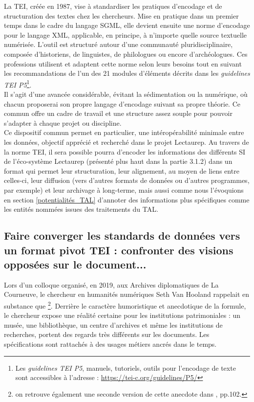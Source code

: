 La TEI, créée en 1987, vise à standardiser les pratiques d'encodage et de structuration des textes chez les chercheurs. Mise en pratique dans un premier temps dans le cadre du langage SGML, elle devient ensuite une norme d'encodage pour le langage XML, applicable, en principe, à n'importe quelle source textuelle numérisée. L'outil est structuré autour d'une communauté pluridisciplinaire, composée d'historiens, de linguistes, de philologues ou encore d'archéologues. Ces professions utilisent et adaptent cette norme selon leurs besoins tout en suivant les recommandations de l'un des 21 modules d'éléments décrits dans les \textit{guidelines TEI P5}\footnote{Les \textit{guidelines TEI P5}, manuels, tutoriels, outils pour l'encodage de texte sont accessibles à l'adresse : \url{https://tei-c.org/guidelines/P5/}}.\\

Il s'agit d'une avancée considérable, évitant la sédimentation ou la  numérique, où chacun proposerai son propre langage d'encodage suivant sa propre théorie. Ce  commun offre un cadre de travail et une structure assez souple pour pouvoir s'adapter à chaque projet ou discipline.\\

Ce dispositif commun permet en particulier, une intéropérabilité minimale entre les données, objectif apprécié et recherché dans le projet Lectaurep. Au travers de la norme TEI, il sera possible pourra d'encoder les informations des différents SI de l'éco-système Lectaurep (présenté plus haut dans la partie 3.1.2) dans un format qui permet leur structuration, leur alignement, au moyen de liens entre celles-ci, leur diffusion (vers d'autres formats de données ou d'autres programmes, par exemple) et leur archivage à long-terme, mais aussi comme nous l'évoquions en section \ref{potentialités_TAL} d'annoter des informations plus spécifiques comme les entités nommées issues des traitements du TAL. 

\subsection{Faire converger les standards de données vers un format pivot TEI : confronter des visions opposées sur le document...}\label{negatif_TEI}

Lors d'un colloque organisé, en 2019, aux Archives diplomatiques de La Courneuve, le chercheur en humanités numériques Seth Van Hooland rappelait en substance que \footnote{\cite{hooland_application_2019} on retrouve également 
une seconde version de cette anecdote dans \cite{gillet_introduction_2016}, pp.102.}. Derrière le caractère humoristique et anecdotique de la formule, le chercheur expose une réalité certaine pour les institutions patrimoniales : un musée, une bibliothèque, un centre d'archives et même les institutions de recherches, portent des regards très différents sur les documents. Les spécifications sont rattachés à des usages métiers ancrés dans le temps.\\


